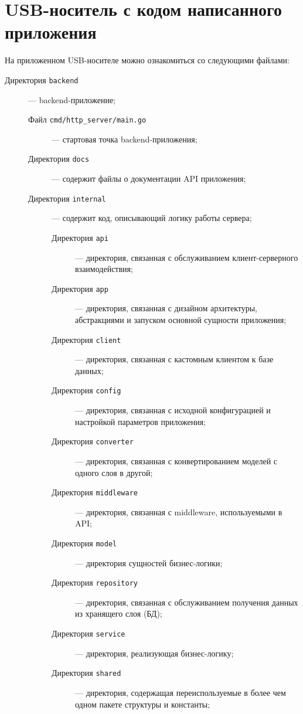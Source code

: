 \documentclass[diploma]{SCWorks}
\begin{document}
\section{USB-носитель с кодом написанного приложения}
\label{appendB}
На приложенном USB-носителе можно ознакомиться со следующими файлами:
\begin{description}
\item[Директория \texttt{backend}] — backend-приложение;
\begin{description}
    \item[Файл \texttt{cmd/http\_server/main.go}] — стартовая точка 
    backend-приложения;
    \item[Директория \texttt{docs}] — содержит файлы о документации API 
    приложения;
    \item[Директория \texttt{internal}] — содержит код, описывающий логику 
    работы сервера;
    \begin{description}
        \item[Директория \texttt{api}] — директория, связанная с обслуживанием 
        клиент-серверного взаимодействия;
        \item[Директория \texttt{app}] — директория, связанная с дизайном 
        архитектуры, абстракциями и запуском основной сущности приложения;
        \item[Директория \texttt{client}] — директория, связанная с кастомным 
        клиентом к базе данных;
        \item[Директория \texttt{config}] — директория, связанная с 
        исходной конфигурацией и настройкой параметров приложения;
        \item[Директория \texttt{converter}] — директория, связанная с 
        конвертированием моделей с одного слоя в другой;
        \item[Директория \texttt{middleware}] — директория, связанная с 
        middleware, используемыми в API;
        \item[Директория \texttt{model}] — директория сущностей бизнес-логики;
        \item[Директория \texttt{repository}] — директория, связанная с 
        обслуживанием получения данных из хранящего слоя (БД);
        \item[Директория \texttt{service}] — директория, реализующая 
        бизнес-логику;
        \item[Директория \texttt{shared}] — директория, содержащая 
        переиспользуемые в более чем одном пакете структуры и константы;
    \end{description}

\end{description}
\end{description}
\end{document}
